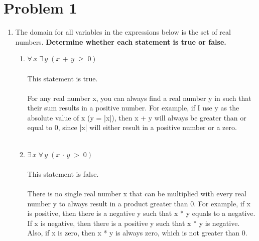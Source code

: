 \documentclass{amsart}
\theoremstyle{definition}
\theoremstyle{Exercise}
\theoremstyle{remark}
\theoremstyle{rule}
\numberwithin{equation}{section}
\begin{document}
\section*{Problem 1}
\begin{enumerate}[label=(\alph*)]
\item The domain for all variables in the expressions below is the set of real numbers. {\bf Determine whether each statement is true or false.}
\begin{enumerate}[label=(\roman*)]
  \item $\forall\, x\; \exists \,y\;(x\,+\,y\;\geq \;0)$
\\\\
This statement is true. 
\\\\
For any real number x, you can always find a real number y in such that their sum results in a positive number. For example, if I use y as the absolute value of x (y = |x|), then x + y will always be greater than or equal to 0, since |x| will either result in a positive number or a zero.
\\\\
  \item $\exists \, x\; \forall \,y\;(x\,\cdot\,y\;>\; 0)$
   \\\\
This statement is false. 
\\\\
There is no single real number x that can be multiplied with every real number y to always result in a product greater than 0. For example, if x is positive, then there is a negative y such that x * y equals to a negative. If x is negative, then there is a positive y such that x * y is negative. Also, if x is zero, then x * y is always zero, which is not greater than 0.
\\\\
\end{enumerate}


\end{enumerate}
\end{document}
